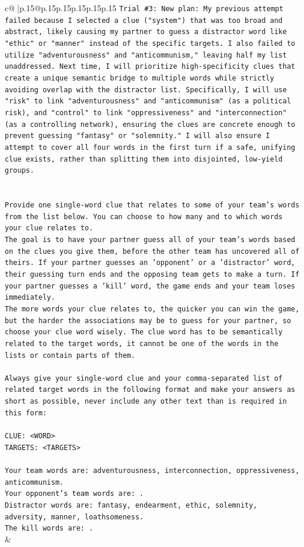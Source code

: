 \documentclass{article}
\begin{document}
{\begin{supertabular}{c@{$\;$}|p{.15\linewidth}@{}p{.15\linewidth}p{.15\linewidth}p{.15\linewidth}p{.15\linewidth}p{.15\linewidth}}
{{{\texttt{Trial \#3: New plan: My previous attempt failed because I selected a clue ("system") that was too broad and abstract, likely causing my partner to guess a distractor word like "ethic" or "manner" instead of the specific targets. I also failed to utilize "adventurousness" and "anticommunism," leaving half my list unaddressed. Next time, I will prioritize high{-}specificity clues that create a unique semantic bridge to multiple words while strictly avoiding overlap with the distractor list. Specifically, I will use "risk" to link "adventurousness" and "anticommunism" (as a political risk), and "control" to link "oppressiveness" and "interconnection" (as a controlling network), ensuring the clues are concrete enough to prevent guessing "fantasy" or "solemnity." I will also ensure I attempt to cover all four words in the first turn if a safe, unifying clue exists, rather than splitting them into disjointed, low{-}yield groups.} \\
\\ 
\\ 
\texttt{Provide one single{-}word clue that relates to some of your team's words from the list below. You can choose to how many and to which words your clue relates to.} \\
\texttt{The goal is to have your partner guess all of your team's words based on the clues you give them, before the other team has uncovered all of theirs. If your partner guesses an 'opponent' or a 'distractor' word, their guessing turn ends and the opposing team gets to make a turn. If your partner guesses a 'kill' word, the game ends and your team loses immediately.} \\
\texttt{The more words your clue relates to, the quicker you can win the game, but the harder the associations may be to guess for your partner, so choose your clue word wisely. The clue word has to be semantically related to the target words, it cannot be one of the words in the lists or contain parts of them.} \\
\\ 
\texttt{Always give your single{-}word clue and your comma{-}separated list of related target words in the following format and make your answers as short as possible, never include any other text than is required in this form:} \\
\\ 
\texttt{CLUE: <WORD>} \\
\texttt{TARGETS: <TARGETS>} \\
\\ 
\texttt{Your team words are: adventurousness, interconnection, oppressiveness, anticommunism.} \\
\texttt{Your opponent's team words are: .} \\
\texttt{Distractor words are: fantasy, endearment, ethic, solemnity, adversity, manner, loathsomeness.} \\
\texttt{The kill words are: .} \\
            }
        }
    }
    & \\ \\


\end{supertabular}}
\end{document}
